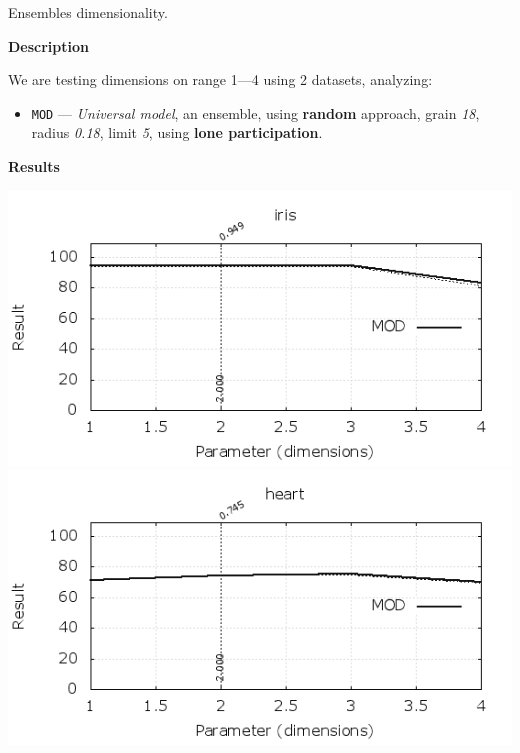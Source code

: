 \begin{experiment}{Ensembles dimensionality.}{\small \sffamily\textbf{Description}

We are testing dimensions on range 1---4 using 2 datasets, analyzing:

\begin{itemize}
\tightlist
	\item \texttt{MOD} --- \emph{Universal model}, an ensemble, using \textbf{random} approach, grain \emph{18}, radius \emph{0.18}, limit \emph{5}, using \textbf{lone participation}.

\end{itemize}


\textbf{Results}

\centering
	\includegraphics[width=.49\textwidth]{plots/experiment_6a_iris.png}
	\includegraphics[width=.49\textwidth]{plots/experiment_6a_heart.png}
	\label{fig:experiment_6a}
}\end{experiment}